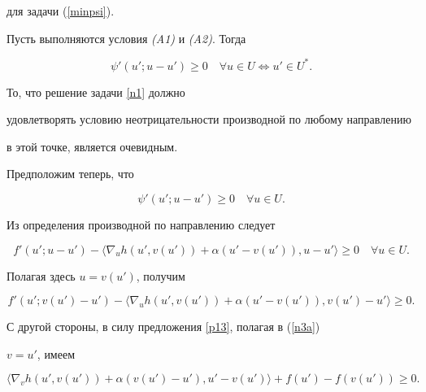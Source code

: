 для задачи (\ref{minpsi}).





\begin{thms}


\label{tst}


Пусть выполняются условия {\em (A1)} и {\em (A2)}. Тогда 


$$


\psi'(u';u-u') \ge 0 \quad \forall u \in U \Longleftrightarrow u' \in U^*.


$$


\end{thms}





\begin{pf}


То, что решение задачи \ref{n1} должно


удовлетворять условию неотрицательности производной по любому направлению 


в этой точке, является очевидным. 


Предположим теперь, что 


$$


\psi'(u';u-u') \ge 0 \quad \forall u \in U.


$$ 


Из определения производной по направлению следует


$$


f'(u';u-u') - \langle \nabla_u h(u', v(u')) + 


\alpha (u'-v(u')),u-u' \rangle \ge 0 \quad \forall u \in U.


$$


Полагая здесь $u=v(u')$, получим


$$


f'(u';v(u')-u') -  \langle \nabla_u h(u', v(u')) + 


\alpha (u'-v(u')),v(u')-u' \rangle \ge 0.


$$


С другой стороны, в силу предложения \ref{p13}, полагая в (\ref{n3a}) 


$v=u'$, имеем


$$


\langle \nabla_v h(u',v(u')) + \alpha (v(u') - u'), u' - v(u') \rangle  + 


f(u') - f(v(u'))  \ge 0.


$$



\end{pf}

